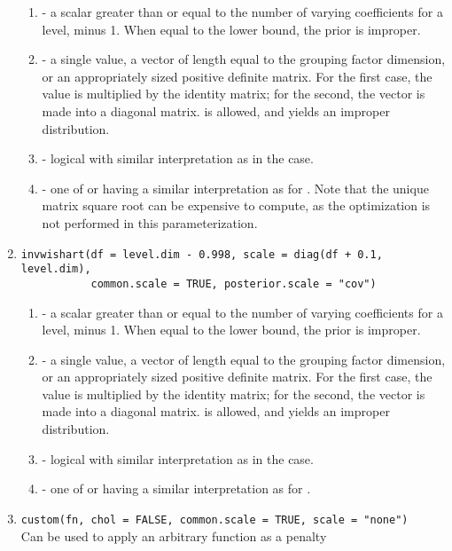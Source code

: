\documentclass[article,shortnames]{jss}
\begin{document}
\begin{enumerate}
\begin{enumerate}
  \item {} - a scalar greater than or equal to the number of
    varying coefficients for a level, minus 1. When equal to the lower
    bound, the prior is improper.
  \item {} - a single value, a vector of length equal to the
    grouping factor dimension, or an appropriately sized positive
    definite matrix. For the first case, the value is multiplied by
    the identity matrix; for the second, the vector is made into a
    diagonal matrix.  is allowed, and yields an improper distribution.
  \item {} - logical with similar interpretation as
    in the  case.
  \item {} - one of  or 
    having a similar interpretation as for . Note that the
    unique matrix square root can be expensive to compute, as the
    optimization is not performed in this parameterization.
  \end{enumerate}
\item
\verb?invwishart(df = level.dim - 0.998, scale = diag(df + 0.1, level.dim),?\\
\verb?           common.scale = TRUE, posterior.scale = "cov")?  \begin{enumerate}
  \item {} - a scalar greater than or equal to the number of
    varying coefficients for a level, minus 1. When equal to the lower
    bound, the prior is improper.
  \item {} - a single value, a vector of length equal to the
    grouping factor dimension, or an appropriately sized positive
    definite matrix. For the first case, the value is multiplied by
    the identity matrix; for the second, the vector is made into a
    diagonal matrix.  is allowed, and yields an improper distribution.
  \item {} - logical with similar interpretation as
    in the  case.
  \item {} - one of  or 
    having a similar interpretation as for .
  \end{enumerate}
\item
\verb?custom(fn, chol = FALSE, common.scale = TRUE, scale = "none")?\\ Can be used to apply an arbitrary function as a penalty
  \begin{enumerate}

\end{enumerate}
\end{enumerate}
\end{document}
